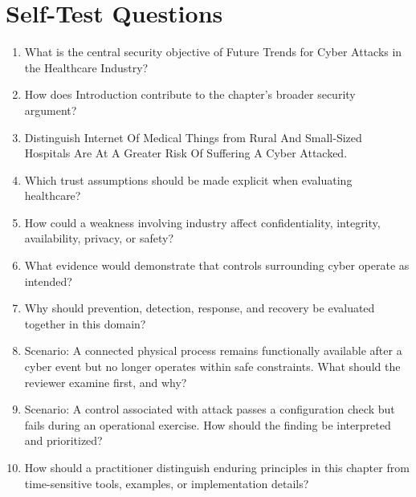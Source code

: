 \documentclass[11pt]{article}
\begin{document}
\section*{Self-Test Questions}
\begin{enumerate}
\item What is the central security objective of Future Trends for Cyber Attacks in the Healthcare Industry?
\item How does Introduction contribute to the chapter's broader security argument?
\item Distinguish Internet Of Medical Things from Rural And Small-Sized Hospitals Are At A Greater Risk Of Suffering A Cyber Attacked.
\item Which trust assumptions should be made explicit when evaluating healthcare?
\item How could a weakness involving industry affect confidentiality, integrity, availability, privacy, or safety?
\item What evidence would demonstrate that controls surrounding cyber operate as intended?
\item Why should prevention, detection, response, and recovery be evaluated together in this domain?
\item Scenario: A connected physical process remains functionally available after a cyber event but no longer operates within safe constraints. What should the reviewer examine first, and why?
\item Scenario: A control associated with attack passes a configuration check but fails during an operational exercise. How should the finding be interpreted and prioritized?
\item How should a practitioner distinguish enduring principles in this chapter from time-sensitive tools, examples, or implementation details?
\end{enumerate}
\end{document}
